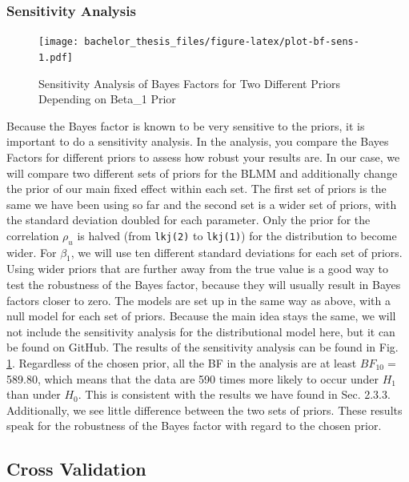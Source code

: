 \documentclass[
  doc,12pt,floatsintext]{apa7}
\begin{document}
\subsubsection{Sensitivity Analysis}\label{sensitivity-analysis}



\begin{figure}
\centering
\texttt{[image: bachelor\_thesis\_files/figure-latex/plot-bf-sens-1.pdf]}
\caption{\label{fig:plot-bf-sens}Sensitivity Analysis of Bayes Factors for Two Different Priors Depending on Beta\_1 Prior}
\end{figure}

Because the Bayes factor is known to be very sensitive to the priors, it is important to do a sensitivity analysis. In the analysis, you compare the Bayes Factors for different priors to assess how robust your results are. In our case, we will compare two different sets of priors for the BLMM and additionally change the prior of our main fixed effect within each set. The first set of priors is the same we have been using so far and the second set is a wider set of priors, with the standard deviation doubled for each parameter. Only the prior for the correlation \(\rho_u\) is halved (from \texttt{lkj(2)} to \texttt{lkj(1)}) for the distribution to become wider. For \(\beta_1\), we will use ten different standard deviations for each set of priors. Using wider priors that are further away from the true value is a good way to test the robustness of the Bayes factor, because they will usually result in Bayes factors closer to zero. The models are set up in the same way as above, with a null model for each set of priors. Because the main idea stays the same, we will not include the sensitivity analysis for the distributional model here, but it can be found on GitHub. The results of the sensitivity analysis can be found in Fig. \ref{fig:plot-bf-sens}. Regardless of the chosen prior, all the BF in the analysis are at least \(BF_{10} =\) 589.80, which means that the data are 590 times more likely to occur under \(H_1\) than under \(H_0\). This is consistent with the results we have found in Sec. 2.3.3. Additionally, we see little difference between the two sets of priors. These results speak for the robustness of the Bayes factor with regard to the chosen prior.

\subsection{Cross Validation}\label{cross-validation}
\end{document}
